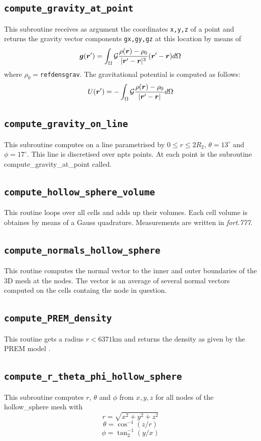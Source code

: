  \subsection{\tt compute\_gravity\_at\_point}
 This subroutine receives as argument the coordinates {\tt x,y,z} of a point and 
 returns the gravity vector components {\tt gx,gy,gz} at this location 
 by means of 
 \[
 {\bm g}({\bm r}') = \int_\Omega {\cal G} \frac{\rho({\bm r})-\rho_0}{|{\bm r}'-{\bm r}|^3} ({\bm r}'-{\bm r}) d\Omega
 \] 
 where $\rho_0=${\tt refdensgrav}.
 The gravitational potential is computed as follows:
 \[
 U({\bm r}') = -\int_\Omega {\cal G} \frac{\rho({\bm r})-\rho_0}{|{\bm r}'-{\bm r}|}  d\Omega
 \]
 \subsection{\tt compute\_gravity\_on\_line}
 This subroutine computes on a line parametrised by $0\leq r \leq 2R_2$,
 $\theta=13^\circ$ and $\phi=17^\circ$. This line is discretised 
 over npts points. At each point is the subroutine compute\_gravity\_at\_point called.
 \subsection{\tt compute\_hollow\_sphere\_volume}
 This routine loops over all cells and adds up their volumes. 
 Each cell volume is obtaines by means of a Gauss quadrature.
 Measurements are written in {\sl fort.777}. 
 \subsection{\tt compute\_normals\_hollow\_sphere}
 This routine computes the normal vector to the inner and outer boundaries of the 3D mesh
 at the nodes. 
 The vector is an average of several normal vectors computed on the cells containg the 
 node in question.
 \subsection{\tt compute\_PREM\_density}
 This routine gets a radius $r<6371$km and returns the density 
 as given by the PREM model \cite{dzan81}. 
 \subsection{\tt compute\_r\_theta\_phi\_hollow\_sphere}
 This subroutine computes $r$, $\theta$ and $\phi$ from $x,y,z$ for all 
 nodes of the hollow\_sphere mesh with
 \[
 r=\sqrt{x^2+y^2+z^2}
 \]
 \[
 \theta=\cos^{-1}(z/r)
 \]
 \[
 \phi=\tan^{-1}_2 (y/x)
 \]
